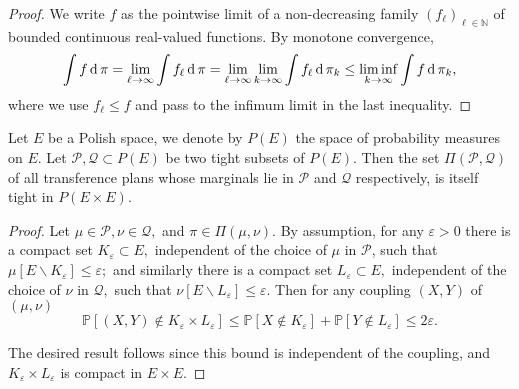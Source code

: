 \begin{proof}
	We write \( f \)  as the pointwise limit of a non-decreasing family \( \left( f _ { \ell } \right) _ { \ell \in \mathbb{ N } } \) of  bounded continuous real-valued functions.
	By monotone convergence,
	\[
		\int f \operatorname{d} \pi = \lim _ { \ell \rightarrow \infty } \int f _ { \ell } \operatorname{d} \pi = \lim _ { \ell \rightarrow \infty } \lim _ { k \rightarrow \infty } \int f _ { \ell } \operatorname{d} \pi _ { k } \leq \liminf _ { k \rightarrow \infty } \int f \operatorname{d} \pi _ { k },
	\]
	where we use $f_\ell \leq f$ and pass to the infimum limit in the last inequality.
\end{proof}

\begin{lem}
	\label{lem:tightness_transference_plan}
	Let $E$ be a Polish space, we denote by $P(E)$ the space of probability measures on $E$.
	Let \( \mathcal{ P }, \mathcal{ Q } \subset P ( E ) \) be two tight subsets of \( P ( E ) \).
	Then the set \( \Pi ( \mathcal{ P } , \mathcal{ Q } ) \) of all transference plans whose marginals lie in \( \mathcal{ P } \) and \( \mathcal{ Q } \) respectively, is itself tight in \( P ( E \times E ) \).
\end{lem}

\begin{proof}
	Let \( \mu \in \mathcal{ P } , \nu \in \mathcal{ Q } , \) and \( \pi \in \Pi ( \mu , \nu ) . \) By assumption, for any \( \varepsilon > 0 \) there is a compact set \( K _ { \varepsilon } \subset E , \) independent of the choice of \( \mu \) in \( \mathcal{ P } \), such that \( \mu \left[ E \backslash K _ { \varepsilon } \right] \leq \varepsilon ; \) and similarly there is a compact set \( L _ { \varepsilon } \subset E , \) independent of the choice of \( \nu \) in \( \mathcal{ Q } , \) such that \( \nu \left[ E \backslash L _ { \varepsilon } \right] \leq \varepsilon . \) Then for any coupling \( ( X , Y ) \) of \( ( \mu , \nu ) \)
	\[ \mathbb{ P } \left[ ( X , Y ) \notin K _ { \varepsilon } \times L _ { \varepsilon } \right] \leq \mathbb{ P } \left[ X \notin K _ { \varepsilon } \right] + \mathbb{ P } \left[ Y \notin L _ { \varepsilon } \right] \leq 2 \varepsilon. \]

	The desired result follows since this bound is independent of the coupling, and \( K _ { \varepsilon } \times L _ { \varepsilon } \) is compact in \( E \times E  \).
\end{proof}

